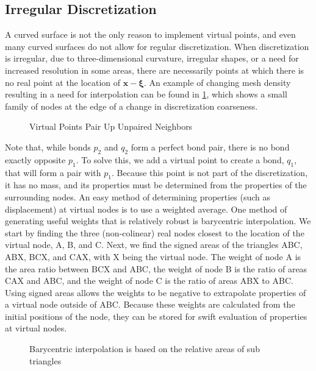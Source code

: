 \subsection{Irregular Discretization}
A curved surface is not the only reason to implement virtual points, and even many curved surfaces do not allow for regular discretization.
When discretization is irregular, due to three-dimensional curvature, irregular shapes, or a need for increased resolution in some areas, there are necessarily points at which there is no real point at the location of $\mathbf{x} - \boldsymbol{\xi}$.
An example of changing mesh density resulting in a need for interpolation can be found in \cref{fig:virtualpoint}, which shows a small family of nodes at the edge of a change in discretization coarseness.
%
\begin{figure}[tbp]
  \centering
  
  \caption{Virtual Points Pair Up Unpaired Neighbors}
  \label{fig:virtualpoint}
\end{figure}
%
Note that, while bonds \(p_2\) and \(q_2\) form a perfect bond pair, there is no bond exactly opposite \(p_1\).
To solve this, we add a virtual point to create a bond, \(q_1\), that will form a pair with \(p_1\).
Because this point is not part of the discretization, it has no mass, and its properties must be determined from the properties of the surrounding nodes.
An easy method of determining properties (such as displacement) at virtual nodes is to use a weighted average.
One method of generating useful weights that is relatively robust is barycentric interpolation.
We start by finding the three (non-colinear) real nodes closest to the location of the virtual node, A, B, and C.
Next, we find the signed areas of the triangles ABC, ABX, BCX, and CAX, with X being the virtual node.
The weight of node A is the area ratio between BCX and ABC, the weight of node B is the ratio of areas CAX and ABC, and the weight of node C is the ratio of areas ABX to ABC.
Using signed areas allows the weights to be negative to extrapolate properties of a virtual node outside of ABC.
Because these weights are calculated from the initial positions of the node, they can be stored for swift evaluation of properties at virtual nodes.

%
\begin{figure}[tbp]
  \centering
  
  \caption{Barycentric interpolation is based on the relative areas of sub triangles}
  \label{fig:BaryCentric}
\end{figure}
%

